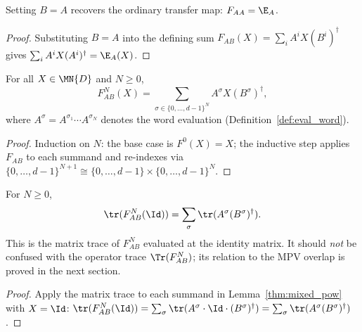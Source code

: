 \begin{theorem}\label{thm:mixed_self}
    \leanok
    Setting $B=A$ recovers the ordinary transfer map: $F_{AA} = \E_A$.
\end{theorem}
\begin{proof}\leanok
    Substituting $B=A$ into the defining sum
    $F_{AB}(X) = \sum_i A^i X (B^i)^\dagger$ gives
    $\sum_i A^i X (A^i)^\dagger = \E_A(X)$.
\end{proof}

\begin{lemma}\label{thm:mixed_pow}
    \leanok
    For all $X \in \MN{D}$ and $N \ge 0$,
    \[
        F_{AB}^N(X)
        =  \sum_{\sigma \in \{0,\ldots,d{-}1\}^N}
        A^\sigma X (B^\sigma)^\dagger,
    \]
    where $A^\sigma = A^{\sigma_1} \cdots A^{\sigma_N}$ denotes the
    word evaluation (Definition~\ref{def:eval_word}).
\end{lemma}

\begin{proof}
    \leanok
    Induction on $N$: the base case is $F^0(X) = X$;
    the inductive step applies $F_{AB}$ to each summand
    and re-indexes via
    $\{0,\ldots,d{-}1\}^{N+1} \cong
        \{0,\ldots,d{-}1\} \times \{0,\ldots,d{-}1\}^N$.
\end{proof}

\begin{lemma}\label{thm:mixed_trace_identity}
    \leanok
    For $N \ge 0$,
    \[
        \tr(F_{AB}^N(\Id))
        =
        \sum_{\sigma}
        \tr(A^\sigma (B^\sigma)^\dagger).
    \]
    This is the matrix trace of $F_{AB}^N$ evaluated at the
    identity matrix.
    It should \emph{not} be confused with the operator trace
    $\Tr(F_{AB}^N)$; its relation to the MPV overlap is proved in the
    next section.
\end{lemma}

\begin{proof}\leanok{}
    Apply the matrix trace to each summand in
    Lemma~\ref{thm:mixed_pow} with $X = \Id$:
    $\tr(F_{AB}^N(\Id))
        = \sum_\sigma \tr(A^\sigma \cdot \Id \cdot (B^\sigma)^\dagger)
        = \sum_\sigma \tr(A^\sigma (B^\sigma)^\dagger)$.
\end{proof}

